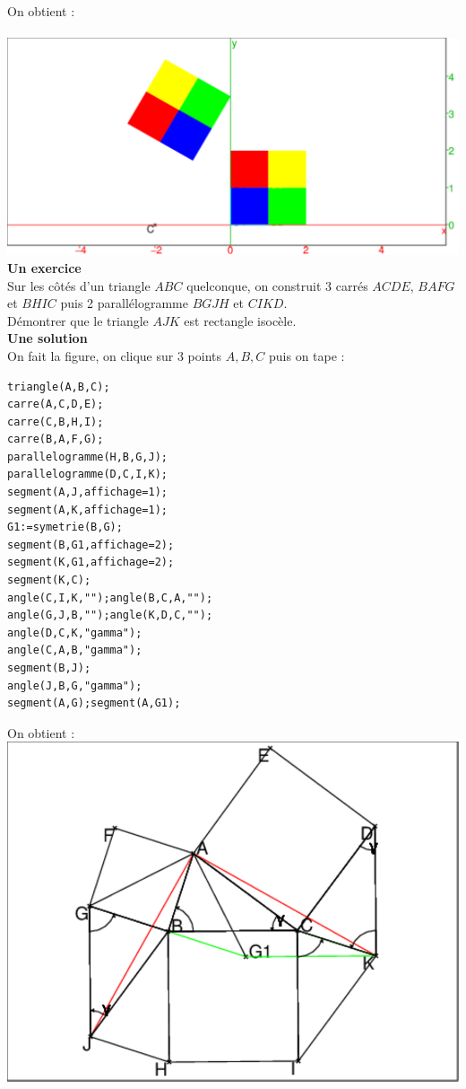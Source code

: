 \documentclass[a4paper,11pt]{book}
\begin{document}
On obtient :\\
\ \\
\includegraphics[width=\textwidth]{damierrot}
{\bf Un exercice}\\
Sur les c\^ot\'es d'un triangle $ABC$ quelconque, on construit 3 carr\'es
$ACDE$, $BAFG$ et $BHIC$ puis 2 parall\'elogramme $BGJH$ et $CIKD$.\\
D\'emontrer que le triangle $AJK$ est rectangle isoc\`ele.\\
{\bf Une solution}\\
On fait la figure, on clique sur 3 points $A,B,C$ puis on tape :
\begin{verbatim}
triangle(A,B,C);
carre(A,C,D,E);
carre(C,B,H,I);
carre(B,A,F,G);
parallelogramme(H,B,G,J);
parallelogramme(D,C,I,K);
segment(A,J,affichage=1);
segment(A,K,affichage=1);
G1:=symetrie(B,G);
segment(B,G1,affichage=2);
segment(K,G1,affichage=2);
segment(K,C);
angle(C,I,K,"");angle(B,C,A,"");
angle(G,J,B,"");angle(K,D,C,"");
angle(D,C,K,"gamma");
angle(C,A,B,"gamma");
segment(B,J);
angle(J,B,G,"gamma");
segment(A,G);segment(A,G1);
\end{verbatim}
On obtient :\\
\includegraphics[width=\textwidth]{rectiso0}
\end{document}
